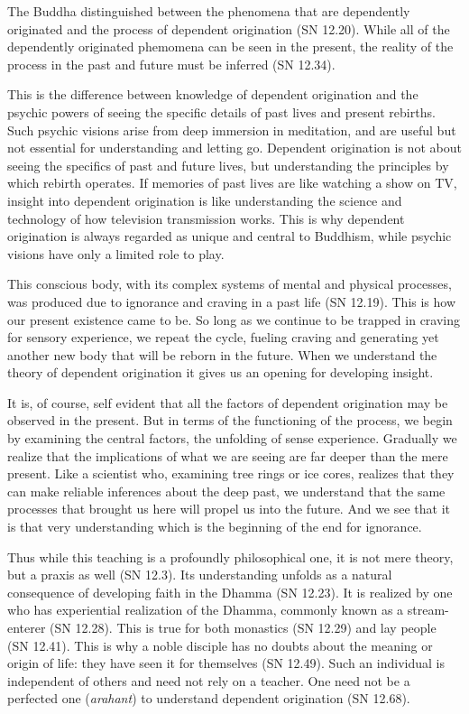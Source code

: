 \documentclass[12pt,openany]{book}%
\begin{document}
The Buddha distinguished between the phenomena that are dependently originated and the process of dependent origination (SN 12.20). While all of the dependently originated phemomena can be seen in the present, the reality of the process in the past and future must be inferred (SN 12.34).

This is the difference between knowledge of dependent origination and the psychic powers of seeing the specific details of past lives and present rebirths. Such psychic visions arise from deep immersion in meditation, and are useful but not essential for understanding and letting go. Dependent origination is not about seeing the specifics of past and future lives, but understanding the principles by which rebirth operates. If memories of past lives are like watching a show on TV, insight into dependent origination is like understanding the science and technology of how television transmission works. This is why dependent origination is always regarded as unique and central to Buddhism, while psychic visions have only a limited role to play.

This conscious body, with its complex systems of mental and physical processes, was produced due to ignorance and craving in a past life (SN 12.19). This is how our present existence came to be. So long as we continue to be trapped in craving for sensory experience, we repeat the cycle, fueling craving and generating yet another new body that will be reborn in the future. When we understand the theory of dependent origination it gives us an opening for developing insight.

It is, of course, self evident that all the factors of dependent origination may be observed in the present. But in terms of the functioning of the process, we begin by examining the central factors, the unfolding of sense experience. Gradually we realize that the implications of what we are seeing are far deeper than the mere present. Like a scientist who, examining tree rings or ice cores, realizes that they can make reliable inferences about the deep past, we understand that the same processes that brought us here will propel us into the future. And we see that it is that very understanding which is the beginning of the end for ignorance.

Thus while this teaching is a profoundly philosophical one, it is not mere theory, but a praxis as well (SN 12.3). Its understanding unfolds as a natural consequence of developing faith in the Dhamma (SN 12.23). It is realized by one who has experiential realization of the Dhamma, commonly known as a stream-enterer (SN 12.28). This is true for both monastics (SN 12.29) and lay people (SN 12.41). This is why a noble disciple has no doubts about the meaning or origin of life: they have seen it for themselves (SN 12.49). Such an individual is independent of others and need not rely on a teacher. One need not be a perfected one (\textit{arahant}) to understand dependent origination (SN 12.68).
\end{document}

